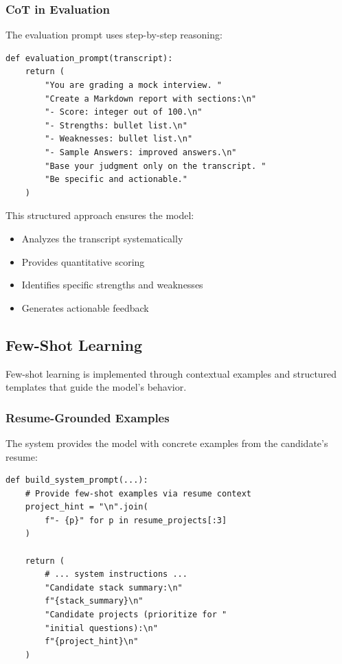 \documentclass[12pt,a4paper]{article}
\begin{document}
\subsubsection{CoT in Evaluation}
The evaluation prompt uses step-by-step reasoning:

\begin{lstlisting}[caption=Evaluation Chain-of-Thought]
def evaluation_prompt(transcript):
    return (
        "You are grading a mock interview. "
        "Create a Markdown report with sections:\n"
        "- Score: integer out of 100.\n"
        "- Strengths: bullet list.\n"
        "- Weaknesses: bullet list.\n"
        "- Sample Answers: improved answers.\n"
        "Base your judgment only on the transcript. "
        "Be specific and actionable."
    )
\end{lstlisting}

This structured approach ensures the model:
\begin{itemize}
    \item Analyzes the transcript systematically
    \item Provides quantitative scoring
    \item Identifies specific strengths and weaknesses
    \item Generates actionable feedback
\end{itemize}

\subsection{Few-Shot Learning}

Few-shot learning is implemented through contextual examples and structured templates that guide the model's behavior.

\subsubsection{Resume-Grounded Examples}
The system provides the model with concrete examples from the candidate's resume:

\begin{lstlisting}[caption=Few-Shot Context Building]
def build_system_prompt(...):
    # Provide few-shot examples via resume context
    project_hint = "\n".join(
        f"- {p}" for p in resume_projects[:3]
    )
    
    return (
        # ... system instructions ...
        "Candidate stack summary:\n"
        f"{stack_summary}\n"
        "Candidate projects (prioritize for "
        "initial questions):\n"
        f"{project_hint}\n"
    )
\end{lstlisting}
\end{document}
